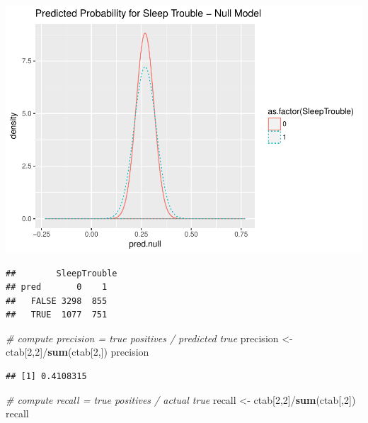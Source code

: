 \documentclass[]{article}
\newenvironment{Shaded}{\begin{snugshade}}{\end{snugshade}}
\newcommand{\KeywordTok}[1]{\textcolor[rgb]{0.13,0.29,0.53}{\textbf{{#1}}}}
\newcommand{\DataTypeTok}[1]{\textcolor[rgb]{0.13,0.29,0.53}{{#1}}}
\newcommand{\DecValTok}[1]{\textcolor[rgb]{0.00,0.00,0.81}{{#1}}}
\newcommand{\FloatTok}[1]{\textcolor[rgb]{0.00,0.00,0.81}{{#1}}}
\newcommand{\StringTok}[1]{\textcolor[rgb]{0.31,0.60,0.02}{{#1}}}
\newcommand{\CommentTok}[1]{\textcolor[rgb]{0.56,0.35,0.01}{\textit{{#1}}}}
\newcommand{\NormalTok}[1]{{#1}}
\begin{document}
\includegraphics{Hmwk7AnswerKey_files/figure-latex/unnamed-chunk-8-1.pdf}

\begin{Shaded}
\end{Shaded}

\begin{verbatim}
##        SleepTrouble
## pred       0    1
##   FALSE 3298  855
##   TRUE  1077  751
\end{verbatim}

\begin{Shaded}
\begin{Highlighting}[]
\CommentTok{# compute precision = true positives / predicted true}
\NormalTok{precision <-}\StringTok{ }\NormalTok{ctab[}\DecValTok{2}\NormalTok{,}\DecValTok{2}\NormalTok{]/}\KeywordTok{sum}\NormalTok{(ctab[}\DecValTok{2}\NormalTok{,])}
\NormalTok{precision}
\end{Highlighting}
\end{Shaded}

\begin{verbatim}
## [1] 0.4108315
\end{verbatim}

\begin{Shaded}
\begin{Highlighting}[]
\CommentTok{# compute recall = true positives / actual true}
\NormalTok{recall <-}\StringTok{ }\NormalTok{ctab[}\DecValTok{2}\NormalTok{,}\DecValTok{2}\NormalTok{]/}\KeywordTok{sum}\NormalTok{(ctab[,}\DecValTok{2}\NormalTok{])}
\NormalTok{recall}
\end{Highlighting}
\end{Shaded}
\end{document}
